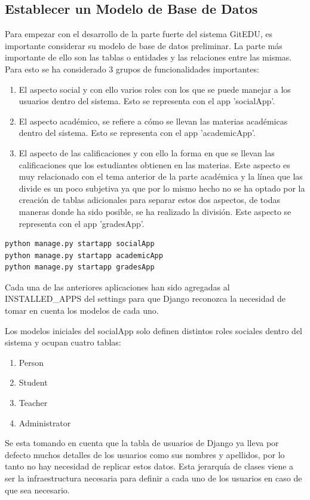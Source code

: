 \subsection{Establecer un Modelo de Base de Datos}
Para empezar con el desarrollo de la parte fuerte del sistema GitEDU, es importante considerar su modelo de base de datos preliminar. La parte más importante de ello son las tablas o entidades y las relaciones entre las mismas. Para esto se ha considerado 3 grupos de funcionalidades importantes:
\begin{enumerate}
	\item El aspecto social y con ello varios roles con los que se puede manejar a los usuarios dentro del sistema. Esto se representa con el app 'socialApp'.
    \item El aspecto académico, se refiere a cómo se llevan las materias académicas dentro del sistema. Esto se representa con el app 'academicApp'.
    \item El aspecto de las calificaciones y con ello la forma en que se llevan las calificaciones que los estudiantes obtienen en las materias. Este aspecto es muy relacionado con el tema anterior de la parte académica y la línea que las divide es un poco subjetiva ya que por lo mismo hecho no se ha optado por la creación de tablas adicionales para separar estos dos aspectos, de todas maneras donde ha sido posible, se ha realizado la división. Este aspecto se representa con el app 'gradesApp'. 
\end{enumerate}

\begin{lstlisting}
python manage.py startapp socialApp
python manage.py startapp academicApp
python manage.py startapp gradesApp
\end{lstlisting}

Cada una de las anteriores aplicaciones han sido agregadas al INSTALLED\_APPS del settings para que Django reconozca la necesidad de tomar en cuenta los modelos de cada uno.

Los modelos iniciales del socialApp solo definen distintos roles sociales dentro del sistema y ocupan cuatro tablas:
\begin{enumerate}
	\item Person
	\item Student
	\item Teacher
	\item Administrator
\end{enumerate}
Se esta tomando en cuenta que la tabla de usuarios de Django ya lleva por defecto muchos detalles de los usuarios como sus nombres y apellidos, por lo tanto no hay necesidad de replicar estos datos. Esta jerarquía de clases viene a ser la infraestructura necesaria para definir a cada uno de los usuarios en caso de que sea necesario.

